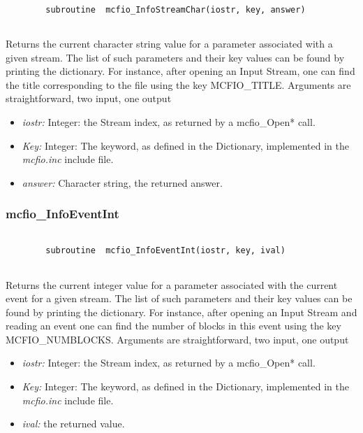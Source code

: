 \begin{verbatim}

        subroutine  mcfio_InfoStreamChar(iostr, key, answer)
    
\end{verbatim}

	Returns the current character string value for a parameter 
	associated with a 
given stream. The list of such parameters and their key values 
can be found by printing the dictionary. For instance, after opening 
an Input Stream, one can find the title corresponding to the file 
using the key MCFIO\_TITLE. Arguments are straightforward, two input,
one output

\begin{itemize}
\item {\em iostr:} Integer: the Stream index, as returned by a mcfio\_Open* 
call.
\item {\em Key:} Integer: The keyword, as defined in the Dictionary, 
implemented in the {\em mcfio.inc} include file. 
\item {\em answer:} Character string,  the  returned answer.
\end{itemize}
	

\subsubsection{mcfio\_InfoEventInt}

\begin{verbatim}

        subroutine  mcfio_InfoEventInt(iostr, key, ival)
    
\end{verbatim}

Returns the current integer value for a parameter associated with the current
event for a given  stream. The list of such parameters and their key values 
can be found by printing the dictionary. For instance, after opening  an Input
Stream and reading an event one can find the number of blocks in this 
 event  using the key
MCFIO\_NUMBLOCKS. Arguments are straightforward, two input, one output

\begin{itemize}
\item {\em iostr:} Integer: the Stream index, as returned by a mcfio\_Open* 
call.
\item {\em Key:} Integer: The keyword, as defined in the Dictionary, 
implemented in the {\em mcfio.inc} include file. 
\item {\em ival:} the  returned value.
\end{itemize}

